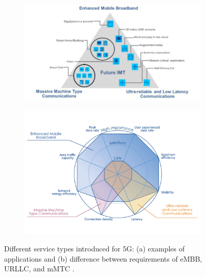 \documentclass[conference]{IEEEtran}
\begin{document}
\begin{figure}
  \centering
  \begin{subfigure}[b]{0.49\columnwidth}
    \includegraphics[width=\columnwidth]{itu-services.png}
    \caption{}
    \label{fig:service-types}
  \end{subfigure}
  \hfill
  \begin{subfigure}[b]{0.49\columnwidth}
    \includegraphics[width=\columnwidth]{spider-chart.png}
    \caption{}
    \label{fig:spider-chart}
  \end{subfigure}
  \caption{Different service types introduced for 5G: (a) examples of applications and (b) difference between requirements of eMBB, URLLC, and mMTC \cite{itu15m2083}.} %
  \label{fig:plots}
\end{figure}
\end{document}
